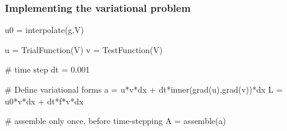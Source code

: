 \begin{frame}[fragile]
  \frametitle{Implementing the variational problem}

\begin{python}
u0 = interpolate(g,V)

u = TrialFunction(V)
v = TestFunction(V)

# time step
dt = 0.001

# Define variational forms
a =  u*v*dx + dt*inner(grad(u),grad(v))*dx
L =  u0*v*dx + dt*f*v*dx

# assemble only once, before time-stepping
A = assemble(a)
\end{python}

\end{frame}
